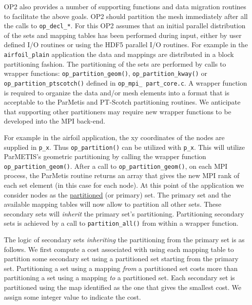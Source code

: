 \documentclass[11pt]{article}
\begin{document}
\noindent OP2 also provides a number of supporting functions and data migration routines to facilitate the above goals.
OP2 should partition the mesh immediately after all the calls to \texttt{op\_decl\_*}. For this OP2 assumes that an
initial parallel distribution of the sets and mapping tables has been performed during input, either by user defined I/O
routines or using the HDF5 parallel I/O routines. For example in the \texttt{airfoil\_plain} application the data and
mappings are distributed in a block partitioning fashion. The partitioning of the sets are performed by calls to wrapper
functions: \texttt{op\_partition\_geom()}, \texttt{op\_partition\_kway()} or \texttt{op\_partition\_ptscotch()} defined
in \texttt{op\_mpi\_ part\_core.c}. A wrapper function is required to organize the data and/or mesh elements into a
format that is acceptable to the ParMetis and PT-Scotch partitioning routines. We anticipate that supporting other
partitioners may require new wrapper functions to be developed into the MPI back-end.


\indent For example in the airfoil application, the xy coordinates of the nodes are supplied in \texttt{p\_x}. Thus
\texttt{op\_partition()} can be utilized with \texttt{p\_x}. This will utilize ParMETIS's geometric partitioning by
calling the wrapper function \texttt{op\_partition\_geom()}. After a call to \texttt{op\_partition\_geom()}, on
each MPI process, the ParMetis routine returns an array that gives the new MPI rank of each set element (in this case
for each node). At this point of the application we consider nodes as the \underline{partitioned} (or primary) set. The
primary set and the available mapping tables will now allow to partition all other sets. These secondary sets will
\textit{inherit} the primary set's partitioning. Partitioning secondary sets is achieved by a call to
\texttt{partition\_all()} from within a wrapper function.

The logic of secondary sets \textit{inheriting} the partitioning from the primary set is as follows. We first compute a
cost associated with using each mapping table to partition some secondary set using a partitioned set starting from
the primary set. Partitioning a set using a mapping \textit{from} a partitioned set costs more than partitioning a set
using a mapping \textit{to} a partitioned set. Each secondary set is partitioned using the map identified as the one
that gives the smallest cost. We assign some integer value to indicate the cost.
\end{document}
